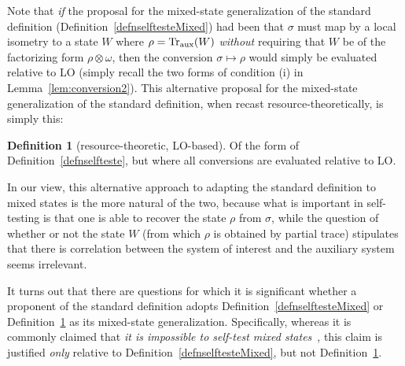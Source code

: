 \documentclass[12pt]{article}
\theoremstyle{plain}
\theoremstyle{definition}
\newtheorem{defn}{Definition}
\begin{document}
Note that {\em if} the proposal for the mixed-state generalization of the standard definition (Definition~\ref{defnselftesteMixed})  had been that $\sigma$ must map
 by a local isometry to a state $W$ where $\rho = {\rm Tr}_{\rm aux}(W)$ {\em without} requiring that $W$ be of the factorizing form $\rho \otimes \omega$, then  the conversion $\sigma \mapsto \rho$ would simply be evaluated relative to LO (simply recall the two forms of condition (i) in Lemma~\ref{lem:conversion2}).  This alternative proposal for the mixed-state generalization of the standard definition, when  
 recast resource-theoretically, is simply this:
\begin{defn}[resource-theoretic, LO-based]
\label{defnselftesteLObased}
Of the form of Definition~\ref{defnselfteste}, but where all conversions are evaluated relative to LO. 
\end{defn}



In our view, this alternative approach to adapting the standard definition to mixed states is the more natural of the two, 
because what is important in self-testing is that one is able to recover the state $\rho$ from $\sigma$, while the question of whether or not the state $W$ (from which $\rho$ is obtained by partial trace) stipulates that there is correlation between the system of interest and the auxiliary system seems irrelevant. 

It turns out that there are questions for which it is significant whether a proponent of the standard definition adopts Definition~\ref{defnselftesteMixed} or Definition~\ref{defnselftesteLObased} as its mixed-state generalization. Specifically, whereas it is commonly claimed that {\em it is impossible to self-test mixed states}~\cite{Coladangelo2017,Supi2018Mutliselftest,vsupic2020self}, this claim is justified {\em only} relative to 
Definition~\ref{defnselftesteMixed}, but not 
Definition~\ref{defnselftesteLObased}.
\end{document}
